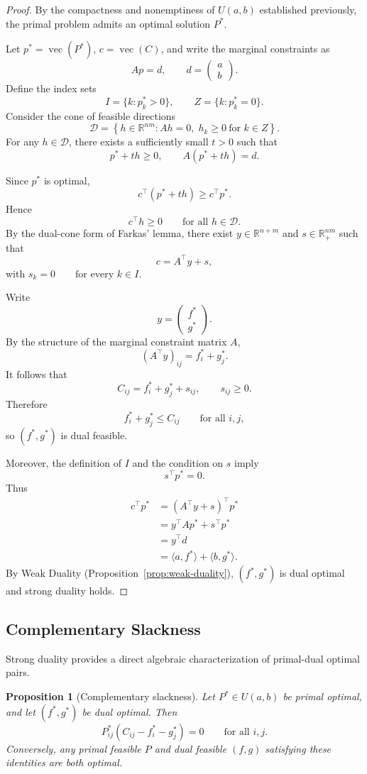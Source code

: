 \documentclass[11pt,a4paper]{article}
\newtheorem{proposition}[theorem]{Proposition}
\theoremstyle{definition}
\begin{document}
\begin{proof}
By the compactness and nonemptiness of $U(a,b)$ established previously,
the primal problem admits an optimal solution $P^*$.

Let $p^*=\operatorname{vec}(P^*)$, $c=\operatorname{vec}(C)$, and write
the marginal constraints as
\[
Ap=d,\qquad d=
\begin{pmatrix}
a\\b
\end{pmatrix}.
\]
Define the index sets
\[ I=\{k:p_k^*>0\}, \qquad Z=\{k:p_k^*=0\}. \]
Consider the cone of feasible directions
\[
\mathcal{D}=\left\{h\in\mathbb{R}^{nm}:Ah=0,\; h_k\geq0\ \text{for }k\in Z\right\}.
\]
For any $h\in\mathcal{D}$, there exists a sufficiently small
$t>0$ such that
\[
p^*+th\geq0,
\qquad
A(p^*+th)=d.
\]

Since $p^*$ is optimal,
\[
c^\top(p^*+th)\geq c^\top p^*.
\]
Hence
\[
c^\top h\geq0 \qquad\text{for all }h\in\mathcal{D}.
\]
By the dual-cone form of Farkas' lemma, there exist
$y\in\mathbb{R}^{n+m}$ and $s\in\mathbb{R}_+^{nm}$ such that
\[c=A^\top y+s,\] with
$s_k=0\qquad\text{for every }k\in I.$

Write
\[
y=
\begin{pmatrix}
f^*\\g^*
\end{pmatrix}.
\]
By the structure of the marginal constraint matrix $A$,
\[
(A^\top y)_{ij}=f_i^*+g_j^*.
\]
It follows that
\[
C_{ij}=f_i^*+g_j^*+s_{ij},\qquad s_{ij}\geq0.
\]
Therefore
\[
f_i^*+g_j^*\leq C_{ij}\qquad\text{for all }i,j,
\]
so $(f^*,g^*)$ is dual feasible.

Moreover, the definition of $I$ and the condition on $s$ imply
\[
s^\top p^*=0.
\]
Thus
\[
\begin{aligned}
c^\top p^*
&=(A^\top y+s)^\top p^*\\
&=y^\top Ap^*+s^\top p^*\\
&=y^\top d\\
&=\langle a,f^*\rangle
+\langle b,g^*\rangle.
\end{aligned}
\]
By Weak Duality (Proposition~\ref{prop:weak-duality}),
$(f^*,g^*)$ is dual optimal and strong duality holds.
\end{proof}

\subsection{Complementary Slackness}

Strong duality provides a direct algebraic characterization of primal-dual optimal pairs.
\begin{proposition}[Complementary slackness]
\label{prop:complementary-slackness}
Let $P^*\in U(a,b)$ be primal optimal, and let $(f^*,g^*)$ be dual optimal.
Then \[P_{ij}^*(C_{ij}-f_i^*-g_j^*)=0\qquad\text{for all }i,j.\]
Conversely, any primal feasible $P$ and dual feasible $(f,g)$ satisfying these identities are both optimal.
\end{proposition}
\end{document}
